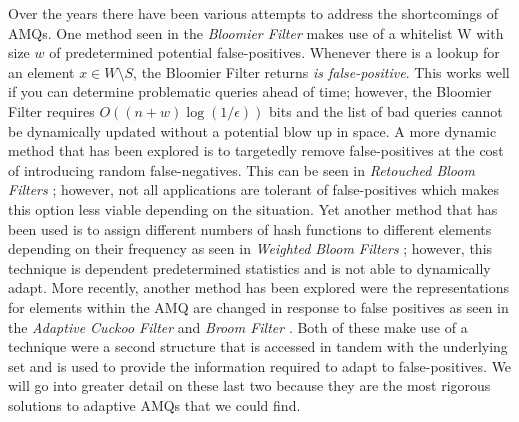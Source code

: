 \documentclass[../paper.tex]{subfiles}
\begin{document}
Over the years there have been various attempts to address the shortcomings of AMQs.  
One method seen in the {\it Bloomier Filter} \cite{bloomier-filter} makes use of a whitelist 
W with size $w$ of predetermined potential false-positives.  Whenever there is a lookup 
for an element $x \in W \setminus S$, the Bloomier Filter returns \textit{is false-positive}.   
This works well if you can determine problematic queries ahead of time; however, the 
Bloomier Filter requires $O((n+w)\log(1/\epsilon))$ bits and the list of bad queries 
cannot be dynamically updated without a potential blow up in space.   A more dynamic 
method that has been explored is to targetedly remove false-positives at the cost of 
introducing random false-negatives.  This can be seen in {\it Retouched Bloom Filters} 
\cite{retouched-filter}; however, not all applications are tolerant of false-positives 
which makes this option less viable depending on the situation.  Yet another method 
that has been used is to assign different numbers of hash functions to different elements
depending on their frequency as seen in {\it Weighted Bloom Filters} \cite{weighted-filter};
however, this technique is dependent predetermined statistics and is not able to dynamically
adapt.  More recently, another method has been explored were the representations for 
elements within the AMQ are changed in response to false positives as seen in the {\it 
Adaptive Cuckoo Filter} \cite{adaptive-cuckoo} and {\it Broom Filter} \cite{broom-filter}. 
Both of these make use of a technique were a second structure that is accessed in tandem 
with the underlying set and is used to provide the information required to adapt to 
false-positives.  We will go into greater detail on these last two because they are the most
rigorous solutions to adaptive AMQs that we could find.  
\end{document}
